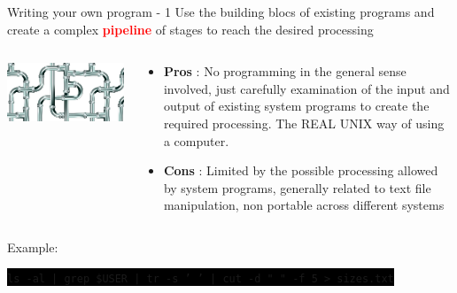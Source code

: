 \documentclass[unknownkeysallowed, 10pt, a4 paper, handout]{beamer}
\newcommand{\code}[1]{\colorbox{black}{\color{green}\texttt{#1}}}
\begin{document}
\begin{frame}[label=pipelining]{Writing your own program - 1}
  Use the building blocs of existing programs and create a complex
  \textcolor{red}{\textbf{pipeline}} of stages to reach the desired processing
  \begin{columns}[T]
    \begin{column}{.33\textwidth}
      \vspace{20pt}
      \includegraphics[scale=0.25]{pics/plumbing-pipes.png}
    \end{column}
    \hfill
    \begin{column}{.66\textwidth}
      \begin{itemize}
        \item \textbf{Pros} : No programming in the general sense involved,
          just carefully examination of the input and output of existing
          system programs to create the required processing. The REAL UNIX way
          of using a computer.
        \item \textbf{Cons} : Limited by the possible processing allowed by
          system programs, generally related to text file manipulation,
          non portable across different systems
      \end{itemize}
    \end{column}
  \end{columns}
  Example:
  \begin{center}
    \code{ls -al | grep \${USER} | tr -s ' ' | cut -d " " -f 5 > sizes.txt}
  \end{center}
\end{frame}
\end{document}
